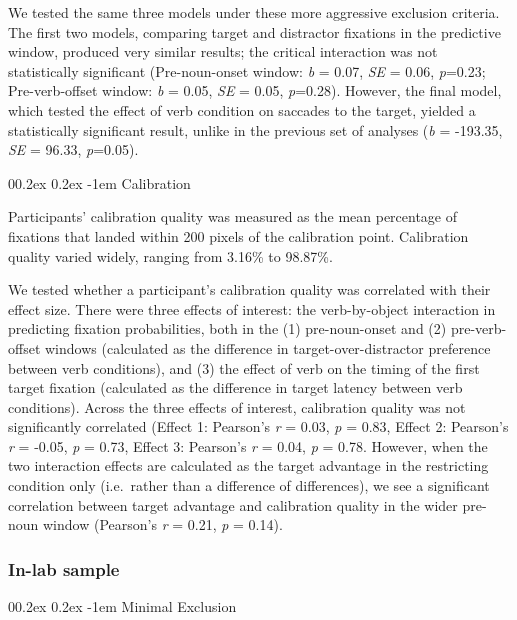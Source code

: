 \documentclass[
  man,floatsintext]{apa6}
\makeatletter
\let\oldparagraph\paragraph
\renewcommand{\paragraph}[1]{\oldparagraph{#1}\mbox{}}
\renewcommand{\paragraph}{\@startsection{paragraph}{4}{\parindent}%
  {0\baselineskip \@plus 0.2ex \@minus 0.2ex}%
  {-1em}%
  {\normalfont\normalsize\bfseries\itshape\typesectitle}}
\makeatother
\begin{document}
We tested the same three models under these more aggressive exclusion criteria. The first two models, comparing target and distractor fixations in the predictive window, produced very similar results; the critical interaction was not statistically significant (Pre-noun-onset window: \emph{b} = 0.07, \emph{SE} = 0.06, \emph{p}=0.23; Pre-verb-offset window: \emph{b} = 0.05, \emph{SE} = 0.05, \emph{p}=0.28). However, the final model, which tested the effect of verb condition on saccades to the target, yielded a statistically significant result, unlike in the previous set of analyses (\emph{b} = -193.35, \emph{SE} = 96.33, \emph{p}=0.05).

\paragraph{Calibration}\label{calibration}

Participants' calibration quality was measured as the mean percentage of fixations that landed within 200 pixels of the calibration point. Calibration quality varied widely, ranging from 3.16\% to 98.87\%.

We tested whether a participant's calibration quality was correlated with their effect size. There were three effects of interest: the verb-by-object interaction in predicting fixation probabilities, both in the (1) pre-noun-onset and (2) pre-verb-offset windows (calculated as the difference in target-over-distractor preference between verb conditions), and (3) the effect of verb on the timing of the first target fixation (calculated as the difference in target latency between verb conditions). Across the three effects of interest, calibration quality was not significantly correlated (Effect 1: Pearson's \emph{r} = 0.03, \emph{p} = 0.83, Effect 2: Pearson's \emph{r} = -0.05, \emph{p} = 0.73, Effect 3: Pearson's \emph{r} = 0.04, \emph{p} = 0.78. However, when the two interaction effects are calculated as the target advantage in the restricting condition only (i.e.~rather than a difference of differences), we see a significant correlation between target advantage and calibration quality in the wider pre-noun window (Pearson's \emph{r} = 0.21, \emph{p} = 0.14).

\subsubsection{In-lab sample}\label{in-lab-sample-1}

\paragraph{Minimal Exclusion}\label{minimal-exclusion-1}
\end{document}
